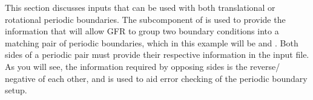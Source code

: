 \label{SEC:BC:Numerical:Periodic:Inputs:Common}

%
This section discusses inputs that can be used with both translational or
rotational periodic boundaries.
%
The  subcomponent of  is used
to provide the information that will allow GFR to group two boundary conditions
into a matching pair of periodic boundaries, which in this example will be
\BCinptext[i]{} and \BCinptext[j]{}.
%
Both sides of a periodic pair must provide their respective information in the
input file.
%
%
As you will see, the information required by opposing sides is the reverse\slash
negative of each other, and is used to aid error checking of the periodic
boundary setup.


